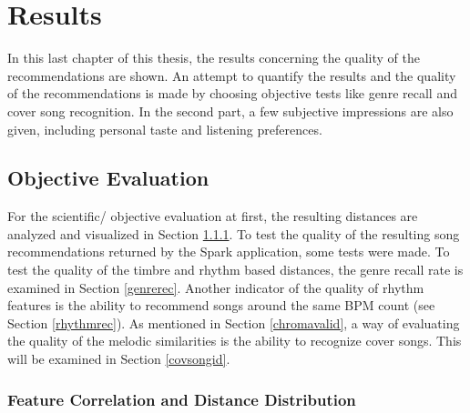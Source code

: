 
\chapter{Results}\label{bds2}

In this last chapter of this thesis, the results concerning the quality of the recommendations are shown. 
An attempt to quantify the results and the quality of the recommendations is made by choosing objective tests like genre recall and cover song recognition. In the second part, a few subjective impressions are also given, including personal taste and listening preferences. 

\section{Objective Evaluation}

For the scientific/ objective evaluation at first, the resulting distances are analyzed and visualized in Section \ref{featqual}.
To test the quality of the resulting song recommendations returned by the Spark application, some tests were made. To test the quality of the timbre and rhythm based distances, the genre recall rate is examined in Section \ref{genrerec}. Another indicator of the quality of rhythm features is the ability to recommend songs around the same BPM count (see Section \ref{rhythmrec}). 
As mentioned in Section \ref{chromavalid}, a way of evaluating the quality of the melodic similarities is the ability to recognize cover songs. This will be examined in Section \ref{covsongid}. 

\subsection{Feature Correlation and Distance Distribution}\label{featqual}

